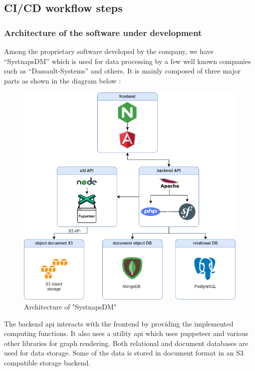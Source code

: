 \subsection{CI/CD workflow steps }

\subsubsection{Architecture of the software under development }

\hspace{7mm}Among the proprietary software developed by the company, we have “SystnapsDM” which is used for data processing by a few well known companies such as “Dassault-Systems” and others. It is mainly composed of three major parts as shown in the diagram below : 

\begin{figure}[H]\centering
\includegraphics[width=1.0\textwidth,angle=00]{assets/f47.png}
\caption{Architecture of "SystnapsDM"}
\label{fig:Architecture of the software under development}
\end{figure}

\hspace{7mm}The backend api interacts with the frontend by providing the implemented computing functions. It also uses a utility api which uses puppeteer and various other libraries for graph rendering. Both relational and document databases are used for data storage. Some of the data is stored in document format in an S3 compatible storage backend.

